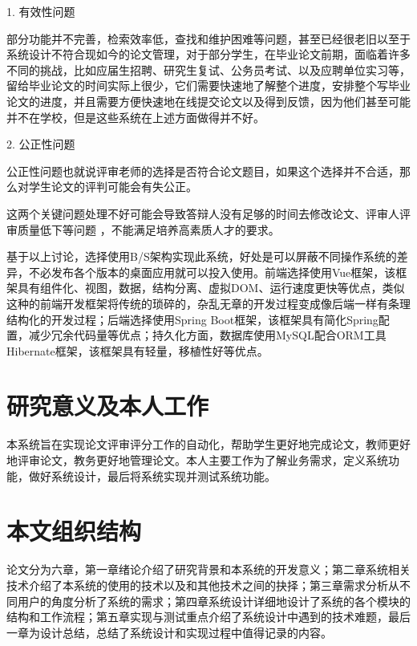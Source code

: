 1. 有效性问题

部分功能并不完善，检索效率低，查找和维护困难等问题，甚至已经很老旧以至于系统设计不符合现如今的论文管理，对于部分学生，在毕业论文前期，面临着许多不同的挑战，比如应届生招聘、研究生复试、公务员考试、以及应聘单位实习等，留给毕业论文的时间实际上很少\cite{.2019c}，它们需要快速地了解整个进度，安排整个写毕业论文的进度，并且需要方便快速地在线提交论文以及得到反馈，因为他们甚至可能并不在学校，但是这些系统在上述方面做得并不好。

2. 公正性问题

公正性问题也就说评审老师的选择是否符合论文题目，如果这个选择并不合适，那么对学生论文的评判可能会有失公正\cite{Setiyani.2020}。

这两个关键问题处理不好可能会导致答辩人没有足够的时间去修改论文、评审人评审质量低下等问题 ，不能满足培养高素质人才的要求\cite{.2019d}。

基于以上讨论，选择使用B/S架构实现此系统，好处是可以屏蔽不同操作系统的差异，不必发布各个版本的桌面应用就可以投入使用。前端选择使用Vue框架，该框架具有组件化、视图，数据，结构分离、虚拟DOM、运行速度更快等优点，类似这种的前端开发框架将传统的琐碎的，杂乱无章的开发过程变成像后端一样有条理结构化的开发过程；后端选择使用Spring Boot框架，该框架具有简化Spring配置，减少冗余代码量等优点；持久化方面，数据库使用MySQL配合ORM工具Hibernate框架，该框架具有轻量，移植性好等优点。

\section{研究意义及本人工作}

本系统旨在实现论文评审评分工作的自动化，帮助学生更好地完成论文，教师更好地评审论文，教务更好地管理论文。本人主要工作为了解业务需求，定义系统功能，做好系统设计，最后将系统实现并测试系统功能。

\section{本文组织结构}

论文分为六章，第一章绪论介绍了研究背景和本系统的开发意义；第二章系统相关技术介绍了本系统的使用的技术以及和其他技术之间的抉择；第三章需求分析从不同用户的角度分析了系统的需求；第四章系统设计详细地设计了系统的各个模块的结构和工作流程；第五章实现与测试重点介绍了系统设计中遇到的技术难题，最后一章为设计总结，总结了系统设计和实现过程中值得记录的内容。
